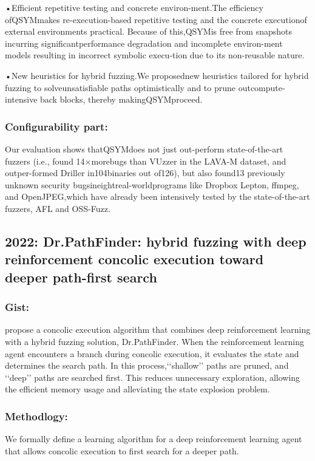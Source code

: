 \documentclass[	runningheads,
				a4paper]{llncs}
\begin{document}
•Efficient repetitive testing and concrete environ-ment.The efficiency ofQSYMmakes re-execution-based repetitive testing and the concrete executionof external environments practical. Because of this,QSYMis free from snapshots incurring significantperformance degradation and incomplete environ-ment models resulting in incorrect symbolic execu-tion due to its non-reusable nature.

•New heuristics for hybrid fuzzing.We proposednew heuristics tailored for hybrid fuzzing to solveunsatisfiable paths optimistically and to prune outcompute-intensive  back  blocks,  thereby  makingQSYMproceed.

\subsubsection{Configurability part:}
Our evaluation shows thatQSYMdoes not just out-perform state-of-the-art fuzzers (i.e.,  found 14×morebugs than VUzzer in the LAVA-M dataset, and outper-formed Driller in104binaries out of126), but also found13 previously unknown security bugsineightreal-worldprograms like Dropbox Lepton, ffmpeg, and OpenJPEG,which have already been intensively tested by the state-of-the-art fuzzers, AFL and OSS-Fuzz.

\subsection{2022: Dr.PathFinder: hybrid fuzzing with deep reinforcement concolic
execution toward deeper path-first search}

\subsubsection{Gist:}
propose a concolic execution algorithm that combines deep reinforcement learning with a hybrid fuzzing
solution, Dr.PathFinder. When the reinforcement learning agent encounters a branch during concolic execution, it evaluates the state and determines the search path. In this process,‘‘shallow’’ paths are pruned, and ‘‘deep’’ paths are searched
first. This reduces unnecessary exploration, allowing the efficient memory usage and alleviating the state explosion
problem.

\subsubsection{Methodlogy:}
We formally define a learning algorithm for a deep
reinforcement learning agent that allows concolic
execution to first search for a deeper path.
\end{document}
